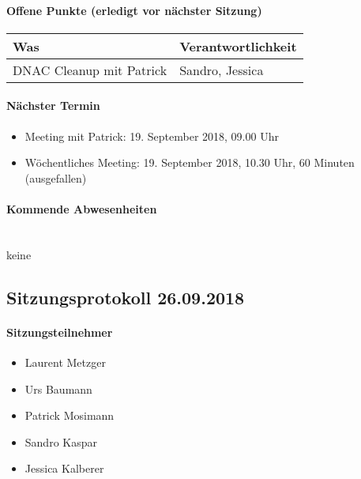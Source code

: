 \paragraph{Offene Punkte (erledigt vor nächster Sitzung)} \mbox{}
\begin{table}[H]
	\centering
	\begin{tabularx}{\textwidth}{X | p{4.5cm}}
		\rowcolor{gray!50}
		\textbf{Was} & \textbf{Verantwortlichkeit} \\
		\hline	
		DNAC Cleanup mit Patrick	& Sandro, Jessica \\	
	\end{tabularx}
	\label{tab:my-label}
\end{table}

\paragraph{Nächster Termin}
\begin{itemize}	
	\item Meeting mit Patrick: 19. September 2018, 09.00 Uhr
	\item Wöchentliches Meeting: 19. September 2018, 10.30 Uhr, 60 Minuten (ausgefallen)
\end{itemize}

\paragraph{Kommende Abwesenheiten} \mbox{}\\
keine

\newpage





\subsection{Sitzungsprotokoll 26.09.2018}

\paragraph{Sitzungsteilnehmer}
\begin{itemize}	
	\item Laurent Metzger 
	\item Urs Baumann 
	\item Patrick Mosimann
	\item Sandro Kaspar
	\item Jessica Kalberer
\end{itemize}

